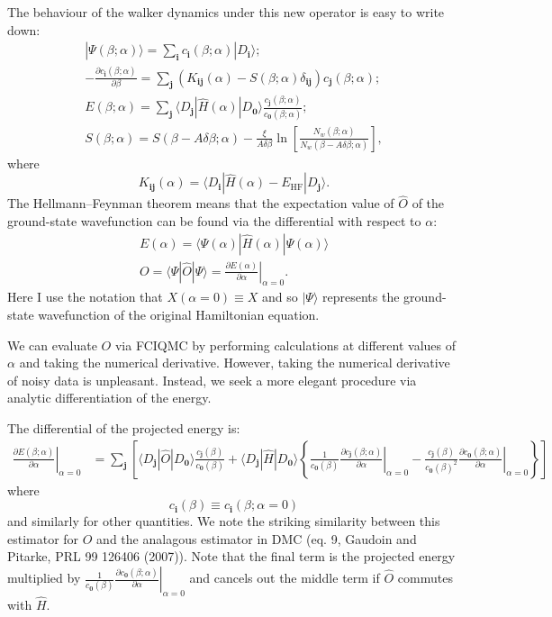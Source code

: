 \documentclass[a4paper, 11pt]{revtex4}
\newcommand{\bi}{\mathbf{i}}
\newcommand{\bj}{\mathbf{j}}
\newcommand{\bz}{\mathbf{0}}
\newcommand{\dd}[2]{\frac{\partial#1}{\partial#2}}
\newcommand{\bra}{\langle}
\newcommand{\ket}{\rangle}
\newcommand{\EHF}{E_{\text{HF}}}
\begin{document}
The behaviour of the walker dynamics under this new operator is easy to write down:
\begin{gather}
|\Psi(\beta;\alpha)\ket = \sum_\bi c_\bi(\beta;\alpha) | D_\bi \ket; \\
- \dd{c_\bi(\beta;\alpha)}{\beta} = \sum_\bj (K_{\bi\bj}(\alpha) - S(\beta;\alpha) \delta_{\bi\bj}) c_\bj(\beta;\alpha);\\
E(\beta;\alpha) = \sum_\bj \bra D_\bj | \hat{H}(\alpha) | D_\bz \ket \frac{c_\bj(\beta;\alpha)}{c_\bz(\beta;\alpha)}; \\
S(\beta;\alpha) = S(\beta - A\delta\beta;\alpha) - \frac{\xi}{A\delta\beta} \ln{\left[\frac{N_w(\beta;\alpha)}{N_w(\beta-A\delta\beta;\alpha)}\right]},
\end{gather}
where
\begin{equation}
K_{\bi\bj}(\alpha) = \bra D_\bi | \hat{H}(\alpha) - \EHF | D_\bj \ket.
\end{equation}
The Hellmann--Feynman theorem means that the expectation value of $\hat{O}$ of the ground-state wavefunction can be found via the differential with respect to $\alpha$:
\begin{gather}
E(\alpha) = \bra \Psi(\alpha) | \hat{H}(\alpha) | \Psi(\alpha) \ket \\
O = \bra \Psi | \hat{O} | \Psi \ket = \left.\dd{E(\alpha)}{\alpha}\right|_{\alpha=0}.
\end{gather}
Here I use the notation that $X(\alpha=0) \equiv X$ and so $|\Psi\ket$ represents the ground-state wavefunction of the original Hamiltonian equation.

We can evaluate $O$ via FCIQMC by performing calculations at different values of $\alpha$ and taking the numerical derivative.  However, taking the numerical derivative of noisy data is unpleasant.  Instead, we seek a more elegant procedure via analytic differentiation of the energy.

The differential of the projected energy is:
\begin{align}
\left.\dd{E(\beta;\alpha)}{\alpha}\right|_{\alpha=0} &= \sum_\bj \left[ \bra D_\bj | \hat{O} | D_\bz \ket \frac{c_\bj(\beta)}{c_\bz(\beta)} + 
\bra D_\bj | \hat{H} | D_\bz \ket \left\{ 
       \frac{1}{c_\bz(\beta)} \left.\dd{c_\bj(\beta;\alpha)}{\alpha}\right|_{\alpha=0} -
       \frac{c_\bj(\beta)}{c_\bz(\beta)^2} \left.\dd{c_\bz(\beta;\alpha)}{\alpha}\right|_{\alpha=0}
   \right\} 
\right] 
\end{align}
where
\begin{equation}
c_\bi(\beta) \equiv c_\bi(\beta;\alpha=0)
\end{equation}
and similarly for other quantities.  We note the striking similarity between
this estimator for $O$ and the analagous estimator in DMC (eq. 9, Gaudoin and Pitarke, PRL 99 126406 (2007)).  Note that the final term is the projected energy multiplied by $\frac{1}{c_\bz(\beta)} \left.\dd{c_\bz(\beta;\alpha)}{\alpha}\right|_{\alpha=0}$ and cancels out the middle term if $\hat{O}$ commutes with $\hat{H}$.
\end{document}
